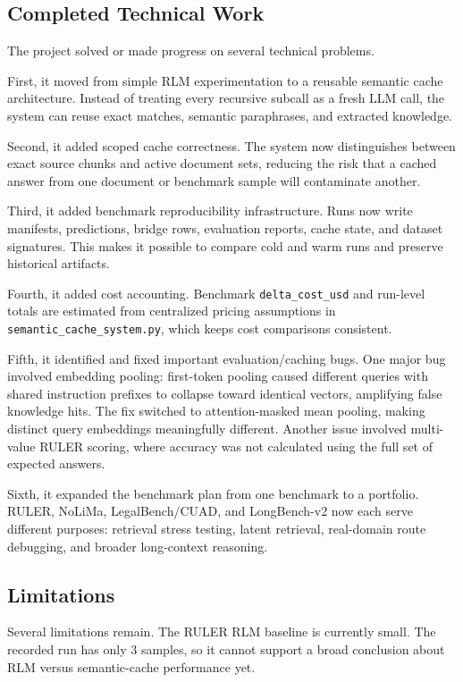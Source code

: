 \documentclass[10pt,a4paper]{article}
\begin{document}
\subsection{Completed Technical Work}

The project solved or made progress on several technical problems.

First, it moved from simple RLM experimentation to a reusable semantic cache architecture. Instead of treating every recursive subcall as a fresh LLM call, the system can reuse exact matches, semantic paraphrases, and extracted knowledge.

Second, it added scoped cache correctness. The system now distinguishes between exact source chunks and active document sets, reducing the risk that a cached answer from one document or benchmark sample will contaminate another.

Third, it added benchmark reproducibility infrastructure. Runs now write manifests, predictions, bridge rows, evaluation reports, cache state, and dataset signatures. This makes it possible to compare cold and warm runs and preserve historical artifacts.

Fourth, it added cost accounting. Benchmark \texttt{delta\_cost\_usd} and run-level totals are estimated from centralized pricing assumptions in \texttt{semantic\_cache\_system.py}, which keeps cost comparisons consistent.

Fifth, it identified and fixed important evaluation/caching bugs. One major bug involved embedding pooling: first-token pooling caused different queries with shared instruction prefixes to collapse toward identical vectors, amplifying false knowledge hits. The fix switched to attention-masked mean pooling, making distinct query embeddings meaningfully different. Another issue involved multi-value RULER scoring, where accuracy was not calculated using the full set of expected answers.

Sixth, it expanded the benchmark plan from one benchmark to a portfolio. RULER, NoLiMa, LegalBench/CUAD, and LongBench-v2 now each serve different purposes: retrieval stress testing, latent retrieval, real-domain route debugging, and broader long-context reasoning.

\subsection{Limitations}

Several limitations remain. The RULER RLM baseline is currently small. The recorded run has only 3 samples, so it cannot support a broad conclusion about RLM versus semantic-cache performance yet.
\end{document}
